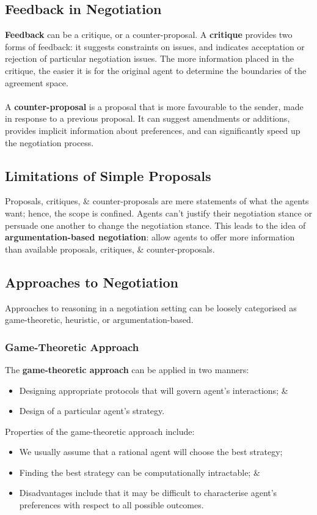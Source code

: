 \documentclass[a4paper,11pt]{article}
\begin{document}
\subsection{Feedback in Negotiation}
\textbf{Feedback} can be a critique, or a counter-proposal.
A \textbf{critique} provides two forms of feedback:
it suggests constraints on issues, and indicates acceptation or rejection of particular negotiation issues.
The more information placed in the critique, the easier it is for the original agent to determine the boundaries of the agreement space.
\\\\
A \textbf{counter-proposal} is a proposal that is more favourable to the sender, made in response to a previous proposal.
It can suggest amendments or additions, provides implicit information about preferences, and can significantly speed up the negotiation process.

\subsection{Limitations of Simple Proposals}
Proposals, critiques, \& counter-proposals are mere statements of what the agents want; hence, the scope is confined.
Agents can't justify their negotiation stance or persuade one another to change the negotiation stance.
This leads to the idea of \textbf{argumentation-based negotiation}: allow agents to offer more information than available proposals, critiques, \& counter-proposals.

\subsection{Approaches to Negotiation}
Approaches to reasoning in a negotiation setting can be loosely categorised as game-theoretic, heuristic, or argumentation-based.

\subsubsection{Game-Theoretic Approach}
The \textbf{game-theoretic approach} can be applied in two manners:
\begin{itemize}
    \item   Designing appropriate protocols that will govern agent's interactions; \&
    \item   Design of a particular agent's strategy.
\end{itemize}

Properties of the game-theoretic approach include:
\begin{itemize}
    \item   We usually assume that a rational agent will choose the best strategy;
    \item   Finding the best strategy can be computationally intractable; \&
    \item   Disadvantages include that it may be difficult to characterise agent's preferences with respect to all possible outcomes.
\end{itemize}
\end{document}
